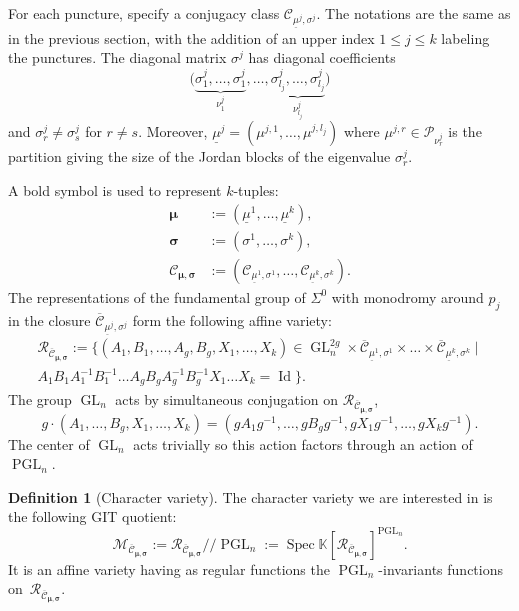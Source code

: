 \documentclass[11pt]{article}
\newcommand{\gitquot}{/\!\!/}
\theoremstyle{definition}
\newtheorem{definition}{Definition}[section]
\theoremstyle{plain}
\DeclareMathOperator{\Spec}{Spec}
\DeclareMathOperator{\Id}{Id}
\DeclareMathOperator{\GL}{GL}
\DeclareMathOperator{\PGL}{PGL}
\newcommand\KK{\mathbb K }
\newcommand{\Part}{\mathcal{P}}
\newcommand{\inv}{^{-1}}
\begin{document}
For each puncture, specify a conjugacy class $\mathcal{C}_{\underline{\mu}^j,\sigma^j}$. The notations are the same as in the previous section, with the addition of an upper index $1\le j\le k$ labeling the punctures. The diagonal matrix $\sigma^j$ has diagonal coefficients
\[
\bigl(\underbrace{\sigma^j_1,\dots,\sigma^j_{1}}_{\nu^j_1},\dots, \underbrace{\sigma^j_{l_j},\dots,\sigma^j_{l_j}}_{\nu^j_{l_j}}\bigr)
\]
and $\sigma^j_r \ne \sigma^j_s$ for $r\ne s$.
Moreover, $\underline{\mu}^j=\left(\mu^{j,1},\dots,\mu^{j,l_j}\right)$ where $\mu^{j,r}\in \Part_{\nu^j_r}$ is the partition giving the size of the Jordan blocks of the eigenvalue $\sigma^j_r$.

A bold symbol is used to represent $k$-tuples:
\begin{equation}\label{eq_bold_kuple}
\begin{split}
\boldsymbol{\mu}& := (\underline{\mu}^1,\dots, \underline{\mu}^k), \\
\boldsymbol{\sigma} & :=(\sigma^1,\dots,\sigma^k),\\
\mathcal{C}_{\boldsymbol{\mu},\boldsymbol{\sigma}} & := (\mathcal{C}_{\underline{\mu}^1,\sigma^1}, \dots, \mathcal{C}_{\underline{\mu}^k,\sigma^k}).
\end{split}
\end{equation}
The representations of the fundamental group of $\Sigma^0$ with monodromy around $p_j$ in the closure $\overline{\mathcal{C}}_{\underline{\mu}^j,\sigma^j}$ form the following affine variety:
\begin{multline*}
\mathcal{R}_{\overline{\mathcal{C}}_{\boldsymbol{\mu},\boldsymbol{\sigma}}}:=\bigl\lbrace\left(A_1,B_1,\dots,A_g,B_g,X_1,\dots,X_k\right)\in \GL_n^{2g}\times \overline{\mathcal{C}}_{\underline{\mu}^1,\sigma^1}\times\dots\times \overline{\mathcal{C}}_{\underline{\mu}^k,\sigma^k}\mid \\ A_1 B_1 A_1\inv B_1\inv \dots A_g B_g A_g\inv B_g\inv X_1\dots X_k =\Id\bigr\rbrace.
\end{multline*}
The group $\GL_n$ acts by simultaneous conjugation on $\mathcal{R}_{\overline{\mathcal{C}}_{\boldsymbol{\mu},\boldsymbol{\sigma}}}$,
\begin{equation*}
g\cdot(A_1,\dots,B_g,X_1,\dots,X_k)=(g A_1 g\inv,\dots,g B_g g\inv,g X_1 g\inv,\dots,g X_k g\inv).
\end{equation*}
The center of $\GL_n$ acts trivially so this action factors through an action of $\PGL_n$.
\begin{definition}[Character variety]
The character variety we are interested in is the following GIT quotient:
\begin{equation*}
\mathcal{M}_{\overline{\mathcal{C}}_{\boldsymbol{\mu},\boldsymbol{\sigma}}} :=\mathcal{R}_{\overline{\mathcal{C}}_{\boldsymbol{\mu},\boldsymbol{\sigma}}} \gitquot\PGL_n :=\Spec \KK[ \mathcal{R}_{\overline{\mathcal{C}}_{\boldsymbol{\mu},\boldsymbol{\sigma}}}]^{\PGL_n}.
\end{equation*}
It is an affine variety having as regular functions the $\PGL_n$-invariants functions on~$\mathcal{R}_{\overline{\mathcal{C}}_{\boldsymbol{\mu},\boldsymbol{\sigma}}}$.
\end{definition}
\end{document}
